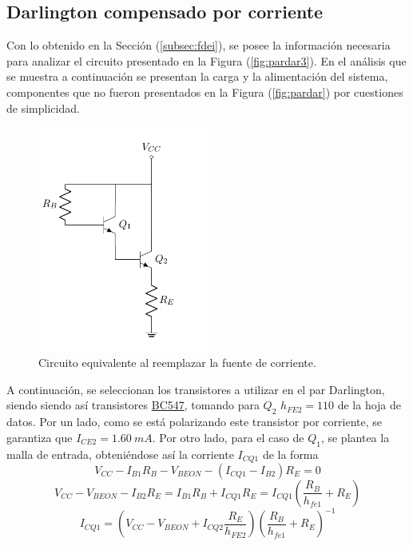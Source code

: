 \subsection{Darlington compensado por corriente}
Con lo obtenido en la Sección (\ref{subsec:fdei}), se posee la información necesaria para analizar el circuito presentado en la Figura (\ref{fig:pardar3}). En el análisis que se muestra a continuación se presentan la carga y la alimentación del sistema, componentes que no fueron presentados en la Figura (\ref{fig:pardar}) por cuestiones de simplicidad.
\begin{figure}[H]
\centering
	\includegraphics[width=0.5\textwidth, page=5]{Imagenes/ParDarlington.pdf}
	\caption{Circuito equivalente al reemplazar la fuente de corriente.}
	\label{fig:pardar4}
\end{figure}

A continuación, se seleccionan los transistores a utilizar en el par Darlington, siendo siendo así transistores \href{https://www.sparkfun.com/datasheets/Components/BC546.pdf}{BC547}, tomando para $Q_2$ $h_{FE2} = 110$ de la hoja de datos. Por un lado, como se está polarizando este transistor por corriente, se garantiza que $I_{CE2} = 1.60 \ mA$. Por otro lado, para el caso de $Q_1$, se plantea la malla de entrada, obteniéndose así la corriente $I_{CQ1}$ de la forma
\begin{equation*}
	V_{CC} - I_{B1} R_B - V_{BEON} - \left( I_{CQ1} - I_{B2} \right) R_E = 0
\end{equation*}
\begin{equation*}
	V_{CC} - V_{BEON} - I_{B2} R_E = I_{B1} R_B + I_{CQ1} R_E = I_{CQ1} \left( \frac{R_B}{h_{fe1}} + R_E \right)
\end{equation*}
\begin{equation}
	I_{CQ1} = \left( V_{CC} - V_{BEON} + I_{CQ2} \frac{R_E}{h_{FE2}} \right) \left( \frac{R_B}{h_{fe1}} + R_E \right)^{-1}
\end{equation}

